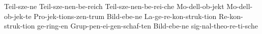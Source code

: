 \hyphenation
{
Teil-sze-ne 
Teil-sze-nen-be-reich 
Teil-sze-nen-be-rei-che 
Mo-dell-ob-jekt
Mo-dell-ob-jek-te
Pro-jek-tions-zen-trum
Bild-ebe-ne
La-ge-re-kon-struk-tion
Re-kon-struk-tion
ge-ring-en
Grup-pen-ei-gen-schaf-ten
Bild-ebe-ne
sig-nal-theo-re-ti-sche
}